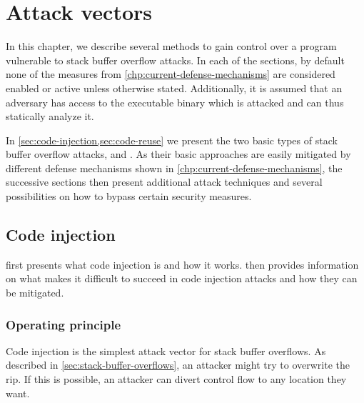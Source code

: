 \chapter{Attack vectors}
\label{chp:attack-vectors}

In this chapter, we describe several methods to gain control over a program vulnerable to stack buffer overflow attacks.
In each of the sections, by default none of the measures from \cref{chp:current-defense-mechanisms} are considered enabled or active unless otherwise stated.
Additionally, it is assumed that an adversary has access to the executable binary which is attacked and can thus statically analyze it.

In \cref{sec:code-injection,sec:code-reuse} we present the two basic types of stack buffer overflow attacks,  and .
As their basic approaches are easily mitigated by different defense mechanisms shown in \cref{chp:current-defense-mechanisms}, the successive sections then present additional attack techniques and several possibilities on how to bypass certain security measures.

\section{Code injection}
\label{sec:code-injection}

 first presents what code injection is and how it works.
 then provides information on what makes it difficult to succeed in code injection attacks and how they can be mitigated.

\subsection{Operating principle}
\label{subsec:ci-operating-principle}

Code injection is the simplest attack vector for stack buffer overflows.
As described in \cref{sec:stack-buffer-overflows}, an attacker might try to overwrite the \gls{rip}.
If this is possible, an attacker can divert control flow to any location they want.

